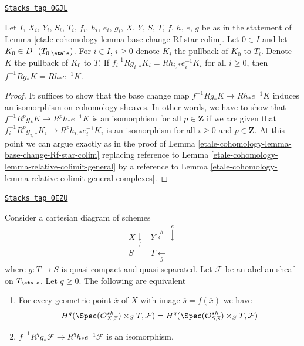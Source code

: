 \begin{lemma}
\label{etale-cohomology-lemma-base-change-Rf-star-colim-complexes}
\href{https://stacks.math.columbia.edu/tag/0GJL}{\texttt{Stacks tag 0GJL}}

Let $I$, $X_i$, $Y_i$, $S_i$, $T_i$, $f_i$, $h_i$, $e_i$, $g_i$,
$X$, $Y$, $S$, $T$, $f$, $h$, $e$, $g$ be as in the statement
of Lemma \ref{etale-cohomology-lemma-base-change-Rf-star-colim}.
Let $0 \in I$ and let $K_0 \in D^+(T_{0, \etale})$.
For $i \in I$, $i \geq 0$ denote $K_i$ the pullback of
$K_0$ to $T_i$. Denote $K$ the pullback of $K_0$ to $T$.
If $f_i^{-1}Rg_{i, *}K_i = Rh_{i, *}e_i^{-1}K_i$
for all $i \geq 0$, then $f^{-1}Rg_*K = Rh_*e^{-1}K$.
\end{lemma}

\begin{proof}
It suffices to show that the base change map
$f^{-1}Rg_*K \to Rh_*e^{-1}K$ induces an isomorphism
on cohomology sheaves. In other words, we have to show
that $f^{-1}R^pg_*K \to R^ph_*e^{-1}K$ is an isomorphism
for all $p \in \mathbf{Z}$ if we are given that
$f_i^{-1}R^pg_{i, *}K_i \to R^ph_{i, *}e_i^{-1}K_i$
is an isomorphism for all $i \geq 0$ and $p \in \mathbf{Z}$.
At this point we can argue exactly as in the proof of
Lemma \ref{etale-cohomology-lemma-base-change-Rf-star-colim}
replacing reference to
Lemma \ref{etale-cohomology-lemma-relative-colimit-general}
by a reference to
Lemma \ref{etale-cohomology-lemma-relative-colimit-general-complexes}.
\end{proof}

\begin{lemma}
\label{etale-cohomology-lemma-base-change-f-star-general-stalks}
\href{https://stacks.math.columbia.edu/tag/0EZU}{\texttt{Stacks tag 0EZU}}

Consider a cartesian diagram of schemes
$$
\begin{array}{cc}X \underset{f}{\downarrow} & Y \overset{h}{\longleftarrow}\overset{e}{\downarrow} \\ S & T \underset{g}{\longleftarrow}\end{array}
$$
where $g : T \to S$ is quasi-compact and quasi-separated.
Let $\mathcal{F}$ be an
abelian sheaf on $T_\etale$. Let $q \geq 0$. The following are equivalent
\begin{enumerate}
\item For every geometric point $\overline{x}$ of $X$ with image
$\overline{s} = f(\overline{x})$ we have
$$
H^q(\Spec(\mathcal{O}^{sh}_{X, \overline{x}}) \times_S T, \mathcal{F})
=
H^q(\Spec(\mathcal{O}^{sh}_{S, \overline{s}}) \times_S T, \mathcal{F})
$$
\item $f^{-1}R^qg_*\mathcal{F} \to R^qh_*e^{-1}\mathcal{F}$
is an isomorphism.
\end{enumerate}
\end{lemma}

